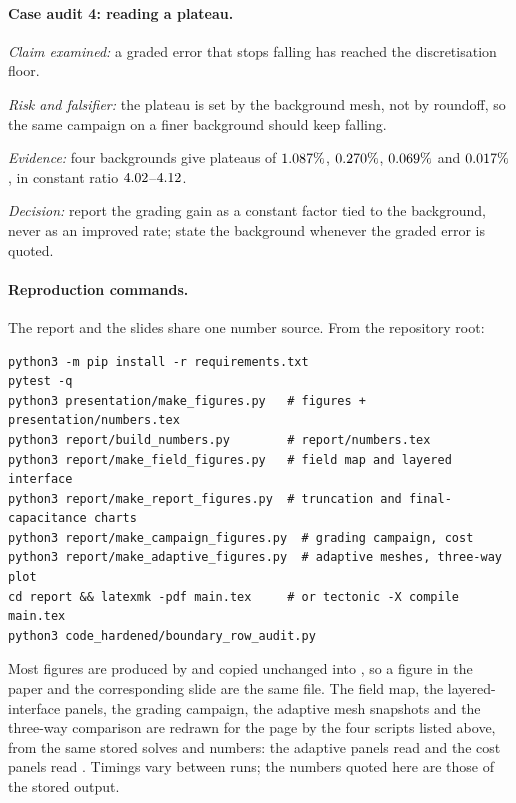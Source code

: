 \documentclass[11pt]{article}
\begin{document}
\paragraph{Case audit 4: reading a plateau.}
\noindent\textit{Claim examined:} a graded error that stops falling has reached the
discretisation floor.

\noindent\textit{Risk and falsifier:} the plateau is set by the background mesh, not by
roundoff, so the same campaign on a finer background should keep falling.

\noindent\textit{Evidence:} four backgrounds give plateaus of
$1.087\%$, $0.270\%$, $0.069\%$ and $0.017\%$, in constant ratio
$4.02$--$4.12$.

\noindent\textit{Decision:} report the grading gain as a constant factor tied to the
background, never as an improved rate; state the background whenever the graded error is
quoted.

\paragraph{Reproduction commands.}
The report and the slides share one number source. From the repository root:
\begin{verbatim}
python3 -m pip install -r requirements.txt
pytest -q
python3 presentation/make_figures.py   # figures + presentation/numbers.tex
python3 report/build_numbers.py        # report/numbers.tex
python3 report/make_field_figures.py   # field map and layered interface
python3 report/make_report_figures.py  # truncation and final-capacitance charts
python3 report/make_campaign_figures.py  # grading campaign, cost
python3 report/make_adaptive_figures.py  # adaptive meshes, three-way plot
cd report && latexmk -pdf main.tex     # or tectonic -X compile main.tex
python3 code_hardened/boundary_row_audit.py
\end{verbatim}
Most figures are produced by  and copied unchanged into
, so a figure in the paper and the corresponding slide are the same
file. The field map, the layered-interface panels, the grading campaign, the adaptive mesh
snapshots and the three-way comparison are redrawn for the page by the four
 scripts listed above, from the same stored solves and numbers: the
adaptive panels read  and the cost
panels read . Timings vary between
runs; the numbers quoted here are those of the stored output.
\end{document}
